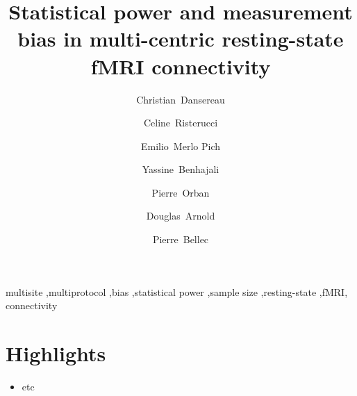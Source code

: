 \documentclass[authoryear]{elsarticle}
\begin{document}
\begin{frontmatter}

\title{Statistical power and measurement bias in multi-centric resting-state fMRI connectivity}



\author[a,b]{Christian~Dansereau}
\author[c]{Celine~Risterucci}
\author[c]{Emilio~Merlo Pich}
\author[a]{Yassine~Benhajali}
\author[a]{Pierre~Orban}
\author[d]{Douglas~Arnold}
\author[a,b]{Pierre~Bellec}
\address[a]{Centre de Recherche de l'Institut Universitaire de G\'eriatrie de Montr\'eal, Montr\'eal, CA}
\address[b]{D\'epartement d'Informatique et de recherche op\'erationnelle, Universit\'e de Montr\'eal, Montr\'eal,CA}
\address[c]{F. Hoffmann-La Roche Ldt., Basel, Switzerland}
\address[d]{NeuroRx, Montreal, Quebec, Canada}

\begin{abstract}


\end{abstract}

\begin{keyword}
multisite \sep multiprotocol \sep bias \sep statistical power \sep sample size \sep resting-state \sep fMRI, connectivity
\end{keyword}
\end{frontmatter}


\section*{Highlights}

\begin{itemize}
\item etc
\end{itemize}
\end{document}
